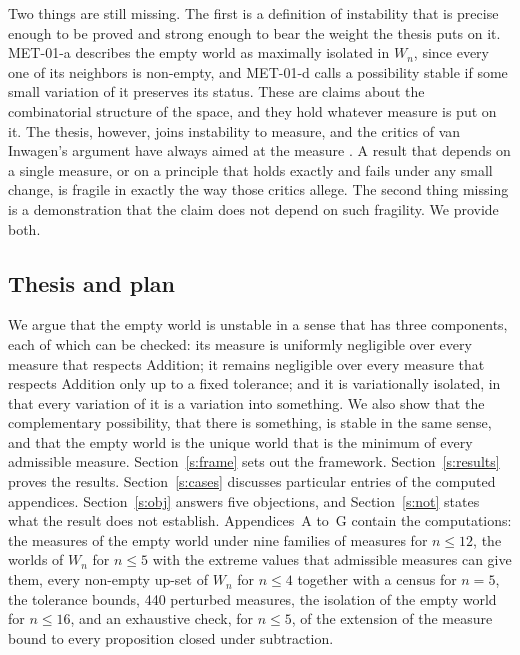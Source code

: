 \documentclass{situationist-preprint}
\begin{document}
Two things are still missing. The first is a definition of instability that is precise enough to be proved and strong enough to bear the weight the thesis puts on it. MET-01-a describes the empty world as maximally isolated in $W_n$, since every one of its neighbors is non-empty, and MET-01-d calls a possibility stable if some small variation of it preserves its status. These are claims about the combinatorial structure of the space, and they hold whatever measure is put on it. The thesis, however, joins instability to measure, and the critics of van Inwagen's argument have always aimed at the measure \citep{Lowe1996,Grunbaum2004}. A result that depends on a single measure, or on a principle that holds exactly and fails under any small change, is fragile in exactly the way those critics allege. The second thing missing is a demonstration that the claim does not depend on such fragility. We provide both.

\subsection{Thesis and plan}

We argue that the empty world is unstable in a sense that has three components, each of which can be checked: its measure is uniformly negligible over every measure that respects Addition; it remains negligible over every measure that respects Addition only up to a fixed tolerance; and it is variationally isolated, in that every variation of it is a variation into something. We also show that the complementary possibility, that there is something, is stable in the same sense, and that the empty world is the unique world that is the minimum of every admissible measure. Section~\ref{s:frame} sets out the framework. Section~\ref{s:results} proves the results. Section~\ref{s:cases} discusses particular entries of the computed appendices. Section~\ref{s:obj} answers five objections, and Section~\ref{s:not} states what the result does not establish. Appendices~A to~G contain the computations: the measures of the empty world under nine families of measures for $n \leq 12$, the worlds of $W_n$ for $n \leq 5$ with the extreme values that admissible measures can give them, every non-empty up-set of $W_n$ for $n \leq 4$ together with a census for $n = 5$, the tolerance bounds, 440 perturbed measures, the isolation of the empty world for $n \leq 16$, and an exhaustive check, for $n \leq 5$, of the extension of the measure bound to every proposition closed under subtraction.
\end{document}
